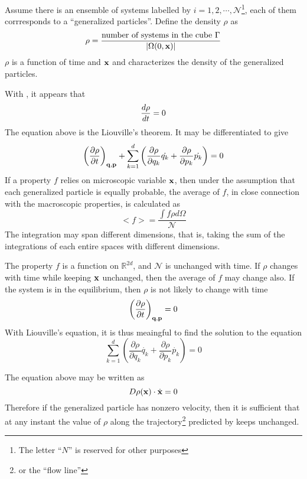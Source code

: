 \def\vn{\mathcal N}
Assume there is an ensemble of systems labelled by $i=1,2,\cdots , \vn$\footnote{The letter ``$N$'' is reserved for other purposes}, each of them corrresponds to a ``generalized particles''. Define the density $\rho$ as
\begin{equation}
\rho=\frac{\text{number of systems in the cube }\Gamma}{|\Omega(0,\mathbf{x})|}
\end{equation}
$\rho$ is a function of time and $\mathbf{x}$ and characterizes the density of the generalized particles.

With , it appears that 
\begin{equation}\label{lio}
\frac{d\rho}{dt}=0
\end{equation}
The equation above is the Liouville's theorem. It may be differentiated to give
\begin{equation}
\left(\frac{\partial\rho}{\partial t}\right)_{\mathbf{q},\mathbf{p}}+\sum_{k=1}^{d}\left(\frac{\partial\rho}{\partial q_k}\dot{q_k}+\frac{\partial\rho}{\partial p_k}\dot{p_k}\right)=0
\end{equation}
If a property $f$ relies on microscopic variable $\mathbf{x}$, then under the assumption that each generalized particle is equally probable, the average of $f$, in close connection with the macroscopic properties, is calculated as
\begin{equation}\label{mac}
<f>=\frac{\int f\rho d\Omega}{\vn}
\end{equation}
The integration may span different dimensions, that is, taking the sum of the integrations of each entire spaces with different dimensions. 

The property $f$ is a function on $\mathbb R^{2d}$, and $\vn$ is unchanged with time. If $\rho$ changes with time while keeping $\mathbf{x}$ unchanged, then the average of $f$ may change also. If the system is 
in the equilibrium, then $\rho$ is not likely to change with time
\[
    \left(\frac{\partial\rho}{\partial t}\right)_{\mathbf{q},\mathbf{p}}=0
    \]
With Liouville's equation, it is thus meaingful to find the solution to the equation
\begin{equation}\label{sta}
\sum_{k=1}^{d}\left(\frac{\partial\rho}{\partial q_k}\dot{q_k}+\frac{\partial\rho}{\partial p_k}\dot{p_k}\right)=0
\end{equation}

The equation above may be written as
\[
    D\rho(\mathbf{x})\cdot\dot{\mathbf{x}}=0
    \]
 Therefore if the generalized particle has nonzero velocity, then it is sufficient that at any instant the value of $\rho$ along the trajectory\footnote{or the ``flow line''} predicted by  keeps unchanged.

